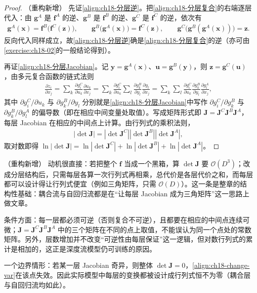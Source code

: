 \documentclass[../main.tex]{subfiles}
\begin{document}
\begin{proof}（重构新增）
先证\eqref{align:ch18-分层逆}。把\eqref{align:ch18-分层复合}的右端逐层代入：由 $\bm{g}^{A}$ 是 $\bm{f}^{A}$ 的逆、$\bm{g}^{B}$ 是 $\bm{f}^{B}$ 的逆、$\bm{g}^{C}$ 是 $\bm{f}^{C}$ 的逆，依次有
\begin{align*}
  \bm{g}^{A}(\bm{x})=\bm{f}^{B}\big(\bm{f}^{C}(\bm{z})\big),\qquad
  \bm{g}^{B}\big(\bm{g}^{A}(\bm{x})\big)=\bm{f}^{C}(\bm{z}),\qquad
  \bm{g}^{C}\big(\bm{g}^{B}(\bm{g}^{A}(\bm{x}))\big)=\bm{z}.
\end{align*}
反向代入同样成立，故\eqref{align:ch18-分层逆}确是\eqref{align:ch18-分层复合}的逆（亦可由\cref{exercise:ch18-02}的一般结论得到）。

再证\eqref{align:ch18-分层Jacobian}。记 $\bm{y}=\bm{g}^{A}(\bm{x})$、$\bm{u}=\bm{g}^{B}(\bm{y})$，则 $\bm{z}=\bm{g}^{C}(\bm{u})$，由多元复合函数的链式法则
\begin{align*}
  \frac{\partial z_i}{\partial x_j}=\sum_{k}\frac{\partial g_i^{C}}{\partial u_k}\frac{\partial u_k}{\partial x_j}
  =\sum_{k}\frac{\partial g_i^{C}}{\partial u_k}\sum_{l}\frac{\partial g_k^{B}}{\partial y_l}\frac{\partial y_l}{\partial x_j}
  =\sum_{k}\sum_{l}\frac{\partial g_i^{C}}{\partial u_k}\frac{\partial g_k^{B}}{\partial y_l}\frac{\partial g_l^{A}}{\partial x_j},
\end{align*}
其中 $\partial g_i^{C}/\partial u_k$ 与 $\partial g_k^{B}/\partial y_l$ 分别就是\eqref{align:ch18-分层Jacobian}中写作 $\partial g_i^{C}/\partial g_k^{B}$ 与 $\partial g_k^{B}/\partial g_l^{A}$ 的偏导数（即在相应中间变量处取值）。写成矩阵形式即 $\bm{J}=\bm{J}^{C}\bm{J}^{B}\bm{J}^{A}$，每层 Jacobian 在相应的中间点上计算。由行列式的乘积法则，
\begin{align*}
  \left|\det\bm{J}\right|=\left|\det\bm{J}^{C}\right|\left|\det\bm{J}^{B}\right|\left|\det\bm{J}^{A}\right|,
\end{align*}
取对数即得 $\ln|\det\bm{J}|=\ln|\det\bm{J}^{C}|+\ln|\det\bm{J}^{B}|+\ln|\det\bm{J}^{A}|$。
\end{proof}

\begin{remark}（重构新增）
动机很直接：若把整个 $\bm{f}$ 当成一个黑箱，算 $\det\bm{J}$ 要 $\mathcal{O}(D^{3})$；改成分层结构后，只需每层各算一次行列式再相乘，总代价是各层代价之和，而每层都可以设计得让行列式便宜（例如三角矩阵，只需 $\mathcal{O}(D)$）。这一条是整章的结构性基础：耦合流与自回归流都是在“让每层 Jacobian 成为三角矩阵”这一思路上做文章。

条件方面：每一层都必须可逆（否则复合不可逆），且都要在相应的中间点连续可微；$\bm{J}=\bm{J}^{C}\bm{J}^{B}\bm{J}^{A}$ 中的三个矩阵在不同的点上取值，不能误认为同一个点处的常数矩阵。另外，层数增加并不改变“可逆性由每层保证”这一逻辑，但对数行列式的累计是相加的，这正是深度流模型仍可训练的原因。

一个边界情形：若某一层 Jacobian 奇异，则整体 $\det\bm{J}=0$，\eqref{align:ch18-change-var}在该点失效。因此实际模型中每层的变换都被设计成行列式恒不为零（耦合层与自回归流均如此）。
\end{remark}
\end{document}
